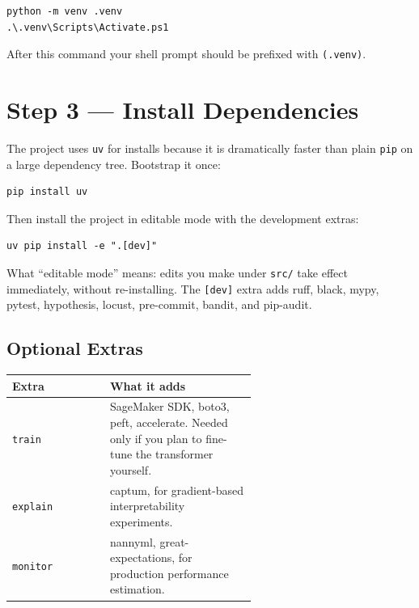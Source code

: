 \documentclass[11pt,a4paper]{article}
\begin{document}
\begin{lstlisting}
python -m venv .venv
.\.venv\Scripts\Activate.ps1
\end{lstlisting}

\noindent After this command your shell prompt should be prefixed with
\texttt{(.venv)}.

\section{Step 3 --- Install Dependencies}

The project uses \texttt{uv} for installs because it is dramatically faster than
plain \texttt{pip} on a large dependency tree. Bootstrap it once:

\begin{lstlisting}
pip install uv
\end{lstlisting}

\noindent Then install the project in editable mode with the development extras:

\begin{lstlisting}
uv pip install -e ".[dev]"
\end{lstlisting}

\noindent What ``editable mode'' means: edits you make under \texttt{src/} take
effect immediately, without re-installing. The \texttt{[dev]} extra adds
ruff, black, mypy, pytest, hypothesis, locust, pre-commit, bandit, and pip-audit.

\subsection{Optional Extras}

\begin{longtable}{@{}lp{0.6\linewidth}@{}}
\toprule
\textbf{Extra} & \textbf{What it adds} \\ \midrule \endhead
\texttt{train}   & SageMaker SDK, boto3, peft, accelerate. Needed only if you
                   plan to fine-tune the transformer yourself. \\
\texttt{explain} & captum, for gradient-based interpretability experiments. \\
\texttt{monitor} & nannyml, great-expectations, for production performance
                   estimation. \\
\bottomrule
\end{longtable}
\end{document}
